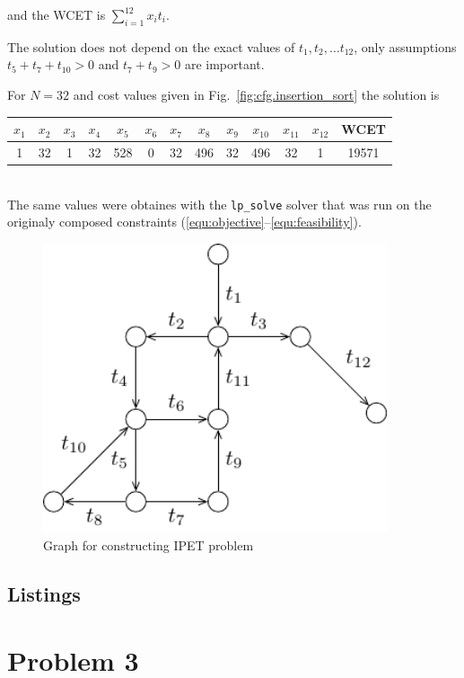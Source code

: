 \documentclass[12pt,a4paper,titlepage,oneside]{article}
\begin{document}
\begin{itemize}
and the WCET is $\sum_{i=1}^{12} x_i t_i$.

The solution does not depend on the exact values of $t_1, t_2, \ldots t_{12}$, only assumptions $t_5 + t_7 + t_{10} > 0$ and $t_7+t_9 > 0$ are important.

For $N=32$ and cost values given in Fig.~\ref{fig:cfg.insertion_sort} the solution is\\

\begin{tabular}{c|c|c|c|c|c|c|c|c|c|c|c|c}
\hline
$x_1$ & $x_2$ & $x_3$ & $x_4$ & $x_5$ & $x_6$ & $x_7$ & $x_8$ & $x_9$ & $x_{10}$ & $x_{11}$ & $x_{12}$ & WCET\\
\hline
1 & 32 & 1 & 32 & 528 & 0 & 32 & 496 & 32 & 496 & 32 & 1 & 19571\\
\hline
\end{tabular}\\

The same values were obtaines with the \texttt{lp\_solve} solver that was run on the originaly composed constraints (\ref{equ:objective}--\ref{equ:feasibility}).

\begin{figure}[hb!]
  \centering
  \includegraphics[width=4in]{graph}
  \caption
  {Graph for constructing IPET problem}
	\label{fig:IPET}
\end{figure}

\end{itemize}
\subsection{Listings}

\newpage
\section{Problem 3}
\end{document}
